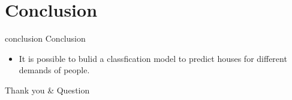 \documentclass[
 size=14pt,
 paper=smartboard, %
 mode=present, %
 display=slides, %
style=tuliplab,
pauseslide,
fleqn,leqno]{powerdot}
\begin{document}
\section{Conclusion}
	
\begin{slide}{conclusion}
	Conclusion
	
	\begin{itemize}
		\item  It is possible to bulid a classfication model to predict houses for different demands of people.
	\end{itemize}
\end{slide}
\begin{wideslide}[toc=,bm=]{}
\vspace*{100pt}
\begin{center} 
\hspace*{100pt}	
{\Huge Thank you \& Question }
\end{center}	
\end{wideslide}
\end{document}
